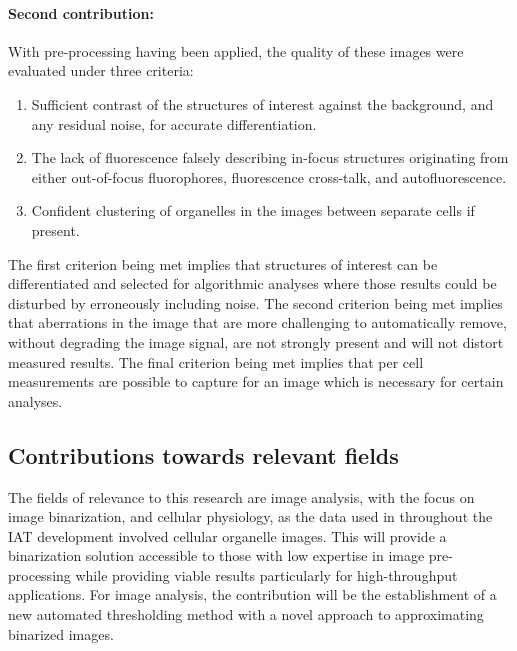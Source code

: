 \paragraph{Second contribution:} 
With pre-processing having been applied, the quality of these images were evaluated under three criteria:
\begin{enumerate}
	\item Sufficient contrast of the structures of interest against the background, and any residual noise, for accurate differentiation.
	\item The lack of fluorescence falsely describing in-focus structures originating from either out-of-focus fluorophores, fluorescence cross-talk, and autofluorescence.
	\item Confident clustering of organelles in the images between separate cells if present.
\end{enumerate}
The first criterion being met implies that structures of interest can be differentiated and selected for algorithmic analyses where those results could be disturbed by erroneously including noise. The second criterion being met implies that aberrations in the image that are more challenging to automatically remove, without degrading the image signal, are not strongly present and will not distort measured results. The final criterion being met implies that per cell measurements are possible to capture for an image which is necessary for certain analyses.

\subsection{Contributions towards relevant fields}
The fields of relevance to this research are image analysis, with the focus on image binarization, and cellular physiology, as the data used in throughout the IAT development involved cellular organelle images. This will provide a binarization solution accessible to those with low expertise in image pre-processing while providing viable results particularly for high-throughput applications. For image analysis, the contribution will be the establishment of a new automated thresholding method with a novel approach to approximating binarized images. 

